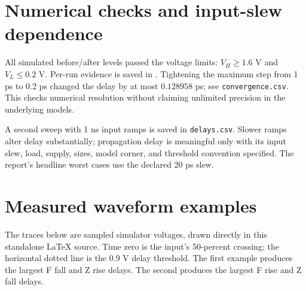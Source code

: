 \documentclass[11pt]{article}
\begin{document}
\section*{Numerical checks and input-slew dependence}
All simulated before/after levels passed the voltage limits: $V_H\ge1.6$ V and $V_L\le0.2$ V. Per-run evidence is saved in . Tightening the maximum step from 1 ps to 0.2 ps changed the delay by at most $0.128958$ ps; see \texttt{convergence.csv}. This checks numerical resolution without claiming unlimited precision in the underlying models.

A second sweep with 1 ns input ramps is saved in \texttt{delays.csv}. Slower ramps alter delay substantially; propagation delay is meaningful only with its input slew, load, supply, sizes, model corner, and threshold convention specified. The report's headline worst cases use the declared 20 ps slew.
\newpage\section*{Measured waveform examples}
The traces below are sampled simulator voltages, drawn directly in this standalone LaTeX source. Time zero is the input's 50-percent crossing; the horizontal dotted line is the 0.9 V delay threshold. The first example produces the largest F fall and Z rise delays. The second produces the largest F rise and Z fall delays.
\end{document}
